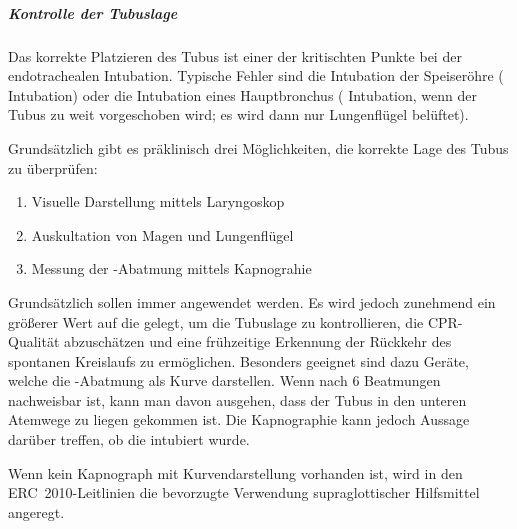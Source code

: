 \subparagraph{Kontrolle der Tubuslage}
Das korrekte Platzieren des Tubus ist einer der kritischten
Punkte bei der endotrachealen Intubation. Typische Fehler
sind die Intubation der Speiseröhre (
Intubation) oder die Intubation eines Hauptbronchus
( Intubation, wenn der Tubus zu weit
vorgeschoben wird; es wird dann nur  Lungenflügel belüftet).

Grundsätzlich gibt es präklinisch drei Möglichkeiten, die
korrekte Lage des Tubus zu überprüfen:
\begin{enumerate}
  \item Visuelle Darstellung mittels Laryngoskop
  \item Auskultation von Magen und Lungenflügel
  \item Messung der -Abatmung mittels Kapnograhie
\end{enumerate}

 Grundsätzlich sollen immer  angewendet werden.
Es wird jedoch zunehmend ein größerer Wert auf die
 gelegt, um die Tubuslage zu kontrollieren,
die CPR-Qualität abzuschätzen und eine frühzeitige Erkennung
der Rückkehr des spontanen Kreislaufs zu ermöglichen.
Besonders geeignet sind dazu Geräte, welche die
-Abatmung als Kurve darstellen. Wenn nach 6
Beatmungen  nachweisbar ist, kann man davon
ausgehen, dass der Tubus in den unteren Atemwege zu liegen
gekommen ist. Die Kapnographie kann jedoch  Aussage
darüber treffen, ob die  intubiert wurde.

Wenn kein Kapnograph mit Kurvendarstellung vorhanden ist,
wird in den ERC~2010-Leitlinien die bevorzugte Verwendung
supraglottischer Hilfsmittel
angeregt.




